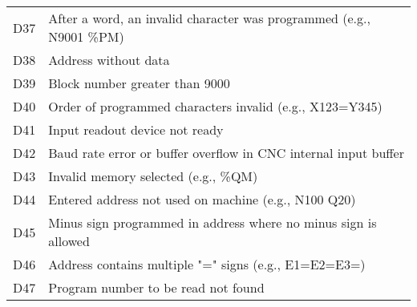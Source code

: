 \documentclass[openany,11pt]{book}
\begin{document}
\begin{table}[!h]
\begin{tabular}{ll}
    D37 & After a word, an invalid character was programmed (e.g., N9001 \%PM) \\
    D38 & Address without data \\
    D39 & Block number greater than 9000 \\
    D40 & Order of programmed characters invalid (e.g., X123=Y345) \\
    D41 & Input readout device not ready \\
    D42 & Baud rate error or buffer overflow in CNC internal input buffer \\
    D43 & Invalid memory selected (e.g., \%QM) \\
    D44 & Entered address not used on machine (e.g., N100 Q20) \\
    D45 & Minus sign programmed in address where no minus sign is allowed \\
    D46 & Address contains multiple "=" signs (e.g., E1=E2=E3=) \\
    D47 & Program number to be read not found \\
    \end{tabular}
\end{table}

\newpage
\end{document}
